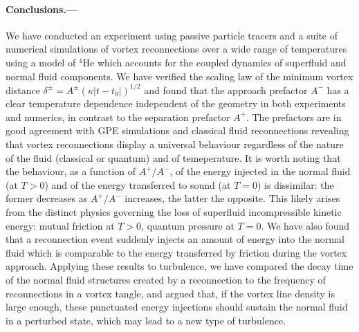 \documentclass[%
 reprint,
 amsmath,amssymb,
 aps,
 prl,
]{revtex4-2}
\begin{document}
\paragraph*{Conclusions.---} We have conducted an experiment using passive particle tracers and a suite of numerical simulations of vortex reconnections over a wide range of temperatures using a model of $^4$He which accounts for the coupled dynamics of superfluid and normal fluid components.
We have verified the scaling law of the minimum vortex distance 
$\delta^{\pm}=A^{\pm} (\kappa |t-t_0|)^{1/2}$ and found that the approach prefactor $A^-$ has a clear temperature dependence independent of the geometry in both experiments and numerics, in contrast to the
separation prefactor $A^+$. The prefactors are in good agreement
with GPE simulations \cite{villoisIrreversibleDynamicsVortex2020,allen2014} 
and classical fluid reconnections \cite{yaoSeparationScalingViscous2020}
revealing that vortex reconnections display a universal behaviour regardless of the nature
of the fluid (classical or quantum) and of temeperature. It is worth noting that the behaviour, as a function of $A^+/A^-$, of 
the energy injected in the normal fluid (at $T>0$) and of the energy transferred to sound (at $T=0$)
\cite{villoisIrreversibleDynamicsVortex2020,leadbeaterSoundEmissionDue2001b} is dissimilar: the former decreases as $A^+/A^-$
increases, the latter the opposite. This likely arises from the distinct physics governing the loss of superfluid 
incompressible kinetic energy: mutual friction at $T>0$, quantum pressure at $T=0$.
We have also found that a reconnection event suddenly injects an amount of energy 
into the normal fluid which is comparable to the energy transferred by friction
during the vortex approach. Applying these results to turbulence, we have
compared the decay time of the normal fluid structures created by a
reconnection to the frequency of reconnections in a vortex tangle, and argued
that, if the vortex line density is large enough, these punctuated
energy injections should sustain the normal fluid in a perturbed state, which may lead to a new type of turbulence.


% 
\end{document}
